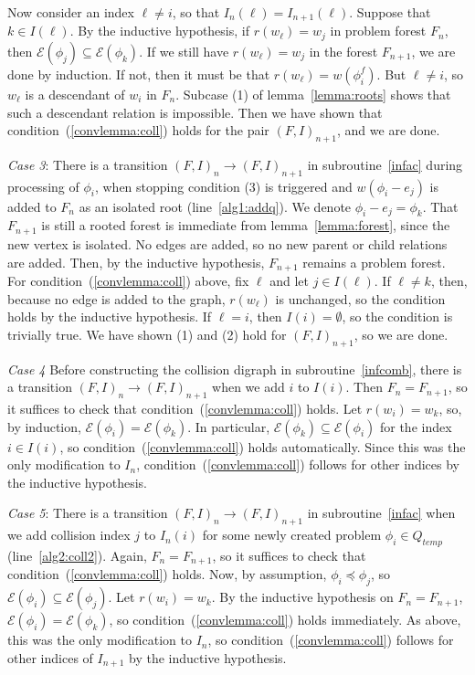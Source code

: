 \documentclass[11pt,reqno]{amsart}
\theoremstyle{definition}
\numberwithin{equation}{section}
\newcommand{\pre}{\phi}
\newcommand{\sub}{\subseteq}
\newcommand{\fix}{\mathcal{E}}
\newcommand{\peq}{\preceq}
\newcommand{\actt}{Q_{temp}}
\newcommand{\coll}{I}
\newcommand{\forest}{F}
\newcommand{\pair}{(F,I)}
\begin{document}
\begin{enumerate}
Now consider an index $\ell \not = i$, so that $\coll_n(\ell) = \coll_{n + 1}(\ell)$. 
Suppose that $k \in \coll(\ell)$. 
By the inductive hypothesis, if $r(w_{\ell}) = w_j$ in problem forest $\forest_n$, then $\fix(\pre_j) \sub \fix(\pre_k)$. 
If we still have $r(w_{\ell}) = w_j$ in the forest $\forest_{n+1}$, we are done by induction. 
If not, then it must be that $r(w_{\ell}) = w(\pre_i^f)$. 
But $\ell \not = i$, so $w_{\ell}$ is a descendant of $w_i$ in $\forest_n$.
Subcase (1) of lemma~\ref{lemma:roots} shows that such a descendant relation is impossible. 
Then we have shown that condition~(\ref{convlemma:coll}) holds for the pair $\pair_{n + 1}$, and we are done. 

\emph{Case 3}: There is a transition $\pair_n \to \pair_{n +1}$ in subroutine~\ref{infac} during processing of $\pre_i$, when stopping condition (3) is triggered and $w(\pre_i - e_j)$ is added to $\forest_n$ as an isolated root (line~\ref{alg1:addq}). 
We denote $\pre_i - e_j = \pre_k$.
That $\forest_{n + 1}$ is still a rooted forest is immediate from lemma~\ref{lemma:forest}, since the new vertex is isolated.
No edges are added, so no new parent or child relations are added. 
Then, by the inductive hypothesis, $\forest_{n + 1}$ remains a problem forest.
For condition~(\ref{convlemma:coll}) above, fix $\ell$ and let $j \in \coll(\ell)$.
If $\ell \not = k$, then, because no edge is added to the graph, $r(w_{\ell})$ is unchanged, so the condition holds by the inductive hypothesis. 
If $\ell = i$, then $\coll(i) = \emptyset$, so the condition is trivially true. 
We have shown (1) and (2) hold for $\pair_{n + 1}$, so we are done.

\emph{Case 4} Before constructing the collision digraph in subroutine~\ref{infcomb}, there is a transition $\pair_n \to \pair_{n + 1}$ when we add $i$ to $\coll(i)$. 
Then $\forest_n = \forest_{n + 1}$, so it suffices to check that condition~(\ref{convlemma:coll}) holds. 
Let $r(w_i) = w_k$, so, by induction, $\fix(\pre_i) = \fix(\pre_k)$. 
In particular, $\fix(\pre_k) \sub \fix(\pre_i)$ for the index $i \in \coll(i)$, so condition~(\ref{convlemma:coll}) holds automatically.
Since this was the only modification to $\coll_n$, condition~(\ref{convlemma:coll}) follows for other indices by the inductive hypothesis.

\emph{Case 5}: There is a transition $\pair_n \to \pair_{n + 1}$ in subroutine~\ref{infac} when we add collision index $j$ to $\coll_n(i)$ for some newly created problem $\pre_i \in \actt$ (line~\ref{alg2:coll2}).
Again, $\forest_n = \forest_{n + 1}$, so it suffices to check that condition~(\ref{convlemma:coll}) holds. 
Now, by assumption, $\pre_i \peq \pre_j$, so $\fix(\pre_i) \sub \fix(\pre_j)$.
Let $r(w_i) = w_k$.
By the inductive hypothesis on $\forest_n = \forest_{n + 1}$, $\fix(\pre_i) = \fix(\pre_k)$, so condition~(\ref{convlemma:coll}) holds immediately.
As above, this was the only modification to $\coll_n$, so condition~(\ref{convlemma:coll}) follows for other indices of $\coll_{n + 1}$ by the inductive hypothesis.


\end{enumerate}
\end{document}

